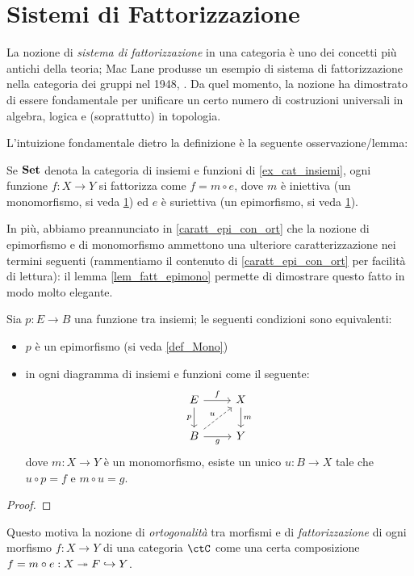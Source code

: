 \label{cap:fattorizzazione}
\chapter{Sistemi di Fattorizzazione}
La nozione di \emph{sistema di fattorizzazione} in una categoria è uno dei concetti più antichi della teoria; Mac Lane produsse un esempio di sistema di fattorizzazione nella categoria dei gruppi nel 1948, \cite{bla}. Da quel momento, la nozione ha dimostrato di essere fondamentale per unificare un certo numero di costruzioni universali in algebra, logica e (soprattutto) in topologia.

L'intuizione fondamentale dietro la definizione è la seguente osservazione/lemma: 
\begin{lemma}
  Se $\mathbf{Set}$ denota la categoria di insiemi e funzioni di \ref{ex_cat_insiemi}, ogni funzione $f : X \to Y$ si fattorizza come $f = m \circ e$, dove $m$ è iniettiva (un monomorfismo, si veda \ref{}) ed $e$ è suriettiva (un epimorfismo, si veda \ref{}).
\end{lemma}
In più, abbiamo preannunciato in \ref{caratt_epi_con_ort} che la nozione di epimorfismo e di monomorfismo ammettono una ulteriore caratterizzazione nei termini seguenti (rammentiamo il contenuto di \ref{caratt_epi_con_ort} per facilità di lettura): il lemma \ref{lem_fatt_epimono} permette di dimostrare questo fatto in modo molto elegante.
\begin{proposition*}
Sia $p : E \to B$ una funzione tra insiemi; le seguenti condizioni sono equivalenti:
\begin{itemize}
  \item $p$ è un epimorfismo (si veda \ref{def_Mono})
  \item in ogni diagramma di insiemi e funzioni come il seguente: 
    \[\begin{tikzcd}
      E \ar[r, "f"]\ar[d, "p"']& X \ar[d, "m"]\\ 
      B \ar[r, "g"'] \ar[ur, dashed, "u"]& Y
    \end{tikzcd}\]
    dove $m : X\to Y$ è un monomorfismo, esiste un unico $u : B\to X$ tale che $u\circ p = f$ e $m\circ u = g$.
\end{itemize}
\end{proposition*}
\begin{proof}
  \Todo{}
\end{proof}

Questo motiva la nozione di \emph{ortogonalità} tra morfismi e di \emph{fattorizzazione} di ogni morfismo \(f : X\to Y\) di una categoria \(\ctC\) come una certa composizione \(f = m\circ e : X \twoheadrightarrow F \hookrightarrow Y\).

